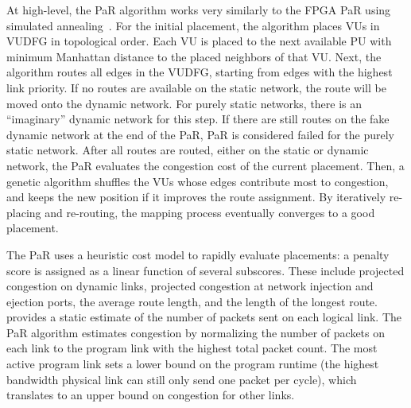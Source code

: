 At high-level, the PaR algorithm works very similarly to the FPGA PaR using
simulated annealing~\cite{simanneal}. 
For the initial placement, the algorithm places VUs in VUDFG in topological order.
Each VU is placed to the next available PU with minimum Manhattan distance to the placed
neighbors of that VU.
Next, the algorithm routes all edges in the VUDFG, starting from edges with the highest link
priority. If no routes are available on the static network, the route will be moved onto the dynamic
network. For purely static networks, there is an ``imaginary'' dynamic network for this step.
If there are still routes on the fake dynamic network at the end of the PaR, PaR is considered
failed for the purely static network.
After all routes are routed, either on the static or dynamic network, the PaR evaluates the
congestion cost of the current placement.
Then, a genetic algorithm shuffles the VUs whose edges contribute most to congestion, 
and keeps the new position if it improves the route assignment.
By iteratively re-placing and re-routing, the mapping process eventually converges to a good placement.

The PaR uses a heuristic cost model to rapidly evaluate placements: a 
penalty score is assigned as a linear function of several subscores.
These include projected congestion on dynamic links, projected congestion at network injection and ejection ports, the average route length, and the length of the longest route.
\name provides a static estimate of the number of packets sent on each logical link.
The PaR algorithm estimates congestion by normalizing the number of packets on each link to the program link with the highest total packet count.
The most active program link sets a lower bound on the program runtime (the highest bandwidth physical link can still only send one packet per cycle), which translates to an upper bound on congestion for other links.


